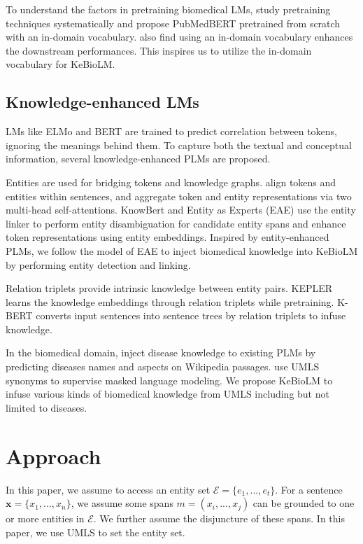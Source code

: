 \documentclass[11pt]{article}
\begin{document}
To understand the factors in pretraining biomedical LMs, 
\citet{gu2020domain} study pretraining techniques systematically
and propose PubMedBERT pretrained from scratch with an in-domain vocabulary.
\citet{lewis-etal-2020-pretrained} also find using an in-domain vocabulary enhances the downstream performances.
This inspires us to utilize the in-domain vocabulary for KeBioLM.




\subsection{Knowledge-enhanced LMs}
LMs like ELMo and BERT are trained to predict
correlation between tokens,
ignoring the meanings behind them.
To capture both the textual and conceptual information,
several knowledge-enhanced PLMs are proposed.


Entities are used for bridging tokens and knowledge graphs.
\citet{zhang-etal-2019-ernie} align tokens and entities within sentences, and aggregate token and entity representations via two multi-head self-attentions.
KnowBert \cite{peters-etal-2019-knowledge} and Entity as Experts (EAE) \cite{fevry-etal-2020-entities} use the entity linker to perform entity disambiguation for candidate entity spans and enhance token representations using entity embeddings.
Inspired by entity-enhanced PLMs, we follow the model of EAE to inject biomedical knowledge into KeBioLM by performing entity detection and linking.

Relation triplets provide intrinsic knowledge between entity pairs.
KEPLER \cite{wang2019kepler} learns the knowledge embeddings through relation triplets while pretraining.
K-BERT \cite{Liu_Zhou_Zhao_Wang_Ju_Deng_Wang_2020} converts input sentences into sentence trees by relation triplets to infuse knowledge.

In the biomedical domain, \citet{he-etal-2020-infusing} inject disease knowledge to existing PLMs by predicting diseases names and aspects on Wikipedia passages.
\citet{michalopoulos2020umlsbert} use UMLS synonyms to supervise masked language modeling.
We propose KeBioLM to infuse various kinds of biomedical knowledge from UMLS including but not limited to diseases.


\section{Approach}

In this paper, we assume to access an entity set $\mathcal{E}=\{e_1, ..., e_t\}$.
For a sentence $\mathbf{x}=\{x_1, ..., x_n\}$,
we assume some spans $m=(x_i, ..., x_j)$ can be grounded to
one or more entities in $\mathcal{E}$.
We further assume the disjuncture of these spans.
In this paper, we use UMLS to set the entity set.
\end{document}
